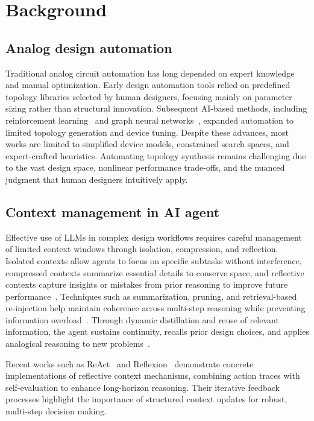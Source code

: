 \section{Background}

\subsection{Analog design automation}

Traditional analog circuit automation has long depended on expert knowledge and manual optimization. Early design automation tools relied on predefined topology libraries selected by human designers, focusing mainly on parameter sizing rather than structural innovation. Subsequent AI-based methods, including reinforcement learning~\cite{zhao2020deep,9576505} and graph neural networks~\cite{liu2021parasitic,dong2023cktgnn}, expanded automation to limited topology generation and device tuning. Despite these advances, most works are limited to simplified device models, constrained search spaces, and expert-crafted heuristics. Automating topology synthesis remains challenging \cite{10937153} due to the vast design space, nonlinear performance trade-offs, and the nuanced judgment that human designers intuitively apply.

\subsection{Context management in AI agent}

Effective use of LLMs in complex design workflows requires careful management of limited context windows through isolation, compression, and reflection\cite{mei2025survey}. Isolated contexts allow agents to focus on specific subtasks without interference, compressed contexts summarize essential details to conserve space, and reflective contexts capture insights or mistakes from prior reasoning to improve future performance~\cite{chang2025sagallm}. Techniques such as summarization, pruning, and retrieval-based re-injection help maintain coherence across multi-step reasoning while preventing information overload~\cite{packer2023memgpt}. Through dynamic distillation and reuse of relevant information, the agent sustains continuity, recalls prior design choices, and applies analogical reasoning to new problems~\cite{lu2025scaling}.

Recent works such as ReAct~\cite{yao2022react} and Reflexion~\cite{shinn2023reflexion} demonstrate concrete implementations of reflective context mechanisms, combining action traces with self-evaluation to enhance long-horizon reasoning. Their iterative feedback processes highlight the importance of structured context updates for robust, multi-step decision making.



